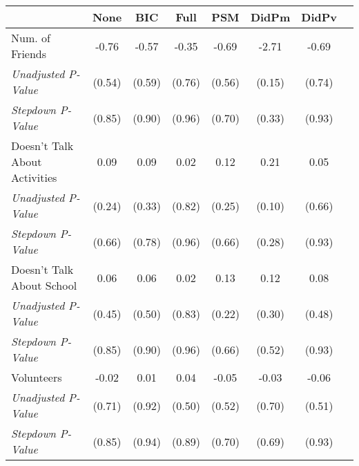 \begin{tabular}{l c c c c c c c}
\toprule
 & None & BIC & Full & PSM & DidPm & DidPv \\
\midrule
Num. of Friends & -0.76 & -0.57 & -0.35 & -0.69 & -2.71 & -0.69 \\
\quad \textit{Unadjusted P-Value} & (0.54) & (0.59) & (0.76) & (0.56) & (0.15) & (0.74) \\
\quad \textit{Stepdown P-Value} & (0.85) & (0.90) & (0.96) & (0.70) & (0.33) & (0.93) \\
Doesn't Talk About Activities & 0.09 & 0.09 & 0.02 & 0.12 & 0.21 & 0.05 \\
\quad \textit{Unadjusted P-Value} & (0.24) & (0.33) & (0.82) & (0.25) & (0.10) & (0.66) \\
\quad \textit{Stepdown P-Value} & (0.66) & (0.78) & (0.96) & (0.66) & (0.28) & (0.93) \\
Doesn't Talk About School & 0.06 & 0.06 & 0.02 & 0.13 & 0.12 & 0.08 \\
\quad \textit{Unadjusted P-Value} & (0.45) & (0.50) & (0.83) & (0.22) & (0.30) & (0.48) \\
\quad \textit{Stepdown P-Value} & (0.85) & (0.90) & (0.96) & (0.66) & (0.52) & (0.93) \\
Volunteers & -0.02 & 0.01 & 0.04 & -0.05 & -0.03 & -0.06 \\
\quad \textit{Unadjusted P-Value} & (0.71) & (0.92) & (0.50) & (0.52) & (0.70) & (0.51) \\
\quad \textit{Stepdown P-Value} & (0.85) & (0.94) & (0.89) & (0.70) & (0.69) & (0.93) \\
\bottomrule
\end{tabular}
